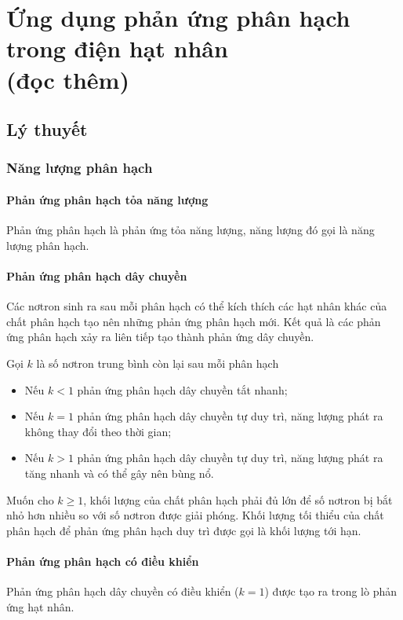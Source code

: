 
\chapter[Ứng dụng phản ứng phân hạch trong điện hạt nhân (đọc thêm)]{Ứng dụng phản ứng phân hạch trong điện hạt nhân\\ (đọc thêm)}
\section{Lý thuyết}

\subsection{Năng lượng phân hạch}
\subsubsection{Phản ứng phân hạch tỏa năng lượng}
Phản ứng phân hạch là phản ứng tỏa năng lượng, năng lượng đó gọi là năng lượng phân hạch.
\subsubsection{Phản ứng phân hạch dây chuyền}
Các nơtron sinh ra sau mỗi phân hạch có thể kích thích các hạt nhân khác của chất phân hạch tạo nên những phản ứng phân hạch mới. Kết quả là các phản ứng phân hạch xảy ra liên tiếp tạo thành phản ứng dây chuyền.

Gọi $k$ là số nơtron trung bình còn lại sau mỗi phân hạch
\begin{itemize}
	\item Nếu $k < 1$ phản ứng phân hạch dây chuyền tắt nhanh;
	\item Nếu $k = 1$ phản ứng phân hạch dây chuyền tự duy trì, năng lượng phát ra không thay đổi theo thời gian;
	\item Nếu $k > 1$ phản ứng phân hạch dây chuyền tự duy trì, năng lượng phát ra tăng nhanh và có thể gây nên bùng nổ.
\end{itemize}

Muốn cho $k \geq 1$, khối lượng của chất phân hạch phải đủ lớn để số nơtron bị bắt nhỏ hơn nhiều so với số nơtron được giải phóng. Khối lượng tối thiểu của chất phân hạch để phản ứng phân hạch duy trì được gọi là khối lượng tới hạn.

\subsubsection{Phản ứng phân hạch có điều khiển}
Phản ứng phân hạch dây chuyền có điều khiển ($k=1$) được tạo ra trong lò phản ứng hạt nhân.

